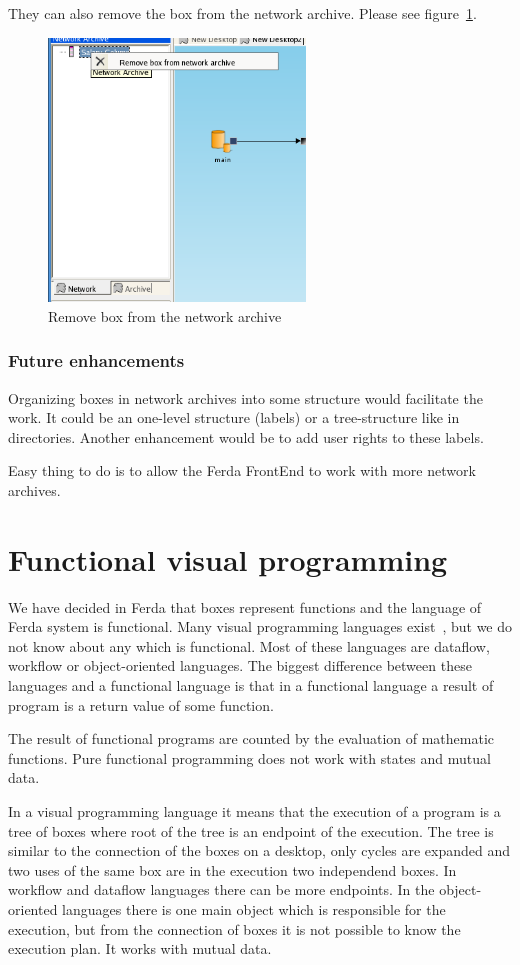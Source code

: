 \documentclass[a4paper,12pt]{book}
\begin{document}
They can also remove the box from the network archive. Please see figure~\ref{fig:removeFromNA}.
\begin{figure}
	\centering
	\includegraphics[height=7cm]{network_archive_remove_box}
	\caption{Remove box from the network archive}
	\label{fig:removeFromNA}
\end{figure}

\subsubsection{Future enhancements}
Organizing boxes in network archives into some structure would facilitate the work. It could be an one-level structure (labels) or a tree-structure like in directories. Another enhancement would be to add user rights to these labels.

Easy thing to do is to allow the Ferda FrontEnd to work with more network archives.

\section{Functional visual programming}
We have decided in Ferda that boxes represent functions and the language of Ferda system is functional. Many visual programming languages exist~\cite{WikiVisualProgrammingLaguage}, but we do not know about any which is functional. Most of these languages are dataflow, workflow or object-oriented languages. The biggest difference between these languages and a functional language is that in a functional language a result of program is a return value of some function.

The result of functional programs are counted by the evaluation of mathematic functions. Pure functional programming does not work with states and mutual data.

In a visual programming language it means that the execution of a program is a tree of boxes where root of the tree is an endpoint of the execution. The tree is similar to the connection of the boxes on a desktop, only cycles are expanded and two uses of the same box are in the execution two independend boxes. In workflow and dataflow languages there can be more endpoints. In the object-oriented languages there is one main object which is responsible for the execution, but from the connection of boxes it is not possible to know the execution plan. It works with mutual data.
\end{document}
